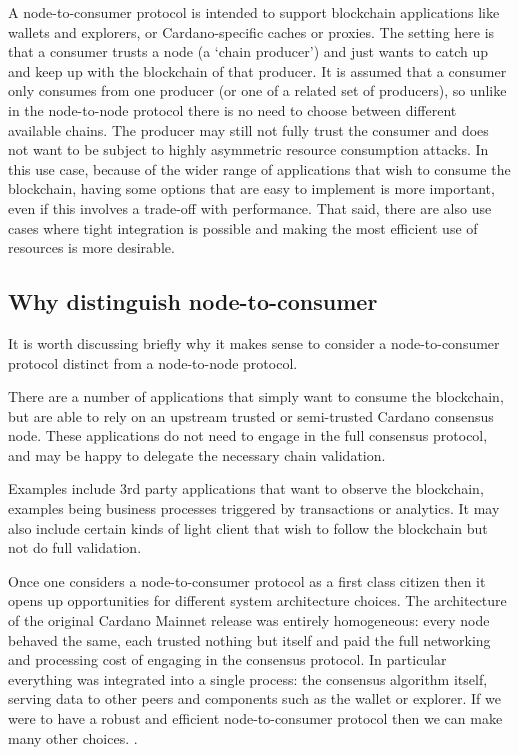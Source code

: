 \documentclass{article}
\newcommand{\njd}[1]{\textcolor{purple}{\emph{#1}}}
\theoremstyle{definition}{
  \newtheorem{lemma}{Lemma}[section] %
  \newtheorem{definition}[lemma]{Definition}
}
\theoremstyle{theorem}{
  \newtheorem{invariant}[lemma]{Invariant}
  \newtheorem{proofobligation}[lemma]{Proof Obligation}
}
\numberwithin{equation}{lemma}
\begin{document}
A node-to-consumer protocol is intended to support blockchain applications
like wallets and explorers, or Cardano-specific caches or proxies. The setting
here is that a consumer trusts a node (a `chain producer') and just wants to
catch up and keep up with the blockchain of that producer. It is assumed that
a consumer only consumes from one producer (or one of a related set of
producers), so unlike in the node-to-node protocol there is no need to choose
between different available chains. The producer may still not fully trust the
consumer and does not want to be subject to highly asymmetric resource
consumption attacks. In this use case, because of the wider range of
applications that wish to consume the blockchain, having some options that are
easy to implement is more important, even if this involves a trade-off with
performance. That said, there are also use cases where tight integration is
possible and making the most efficient use of resources is more desirable.

\subsection{Why distinguish node-to-consumer}

It is worth discussing briefly why it makes sense to consider a node-to-consumer
protocol distinct from a node-to-node protocol.

There are a number of applications that simply want to consume the blockchain,
but are able to rely on an upstream trusted or semi-trusted Cardano consensus
node. These applications do not need to engage in the full consensus protocol,
and may be happy to delegate the necessary chain validation.

Examples include 3rd party applications that want to observe the blockchain,
examples being business processes triggered by transactions or analytics.  It
may also include certain kinds of light client that wish to follow the
blockchain but not do full validation.

Once one considers a node-to-consumer protocol as a first class citizen then it
opens up opportunities for different system architecture choices. The
architecture of the original Cardano Mainnet release was entirely homogeneous:
every node behaved the same, each trusted nothing but itself and paid the full
networking and processing cost of engaging in the consensus protocol.  In
particular everything was integrated into a single process: the consensus
algorithm itself, serving data to other peers and components such as the wallet
or explorer. If we were to have a robust and efficient node-to-consumer protocol
then we can make many other choices. \marginpar{\njd{Process memory space as
    the basis of trust}}.
\end{document}
